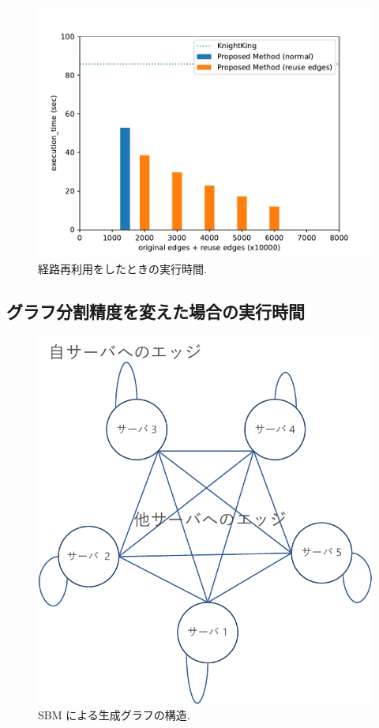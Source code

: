 \begin{figure}[t]
    \centering
    \includegraphics[scale=0.8]{figure/AR_cache.pdf}
    \caption{経路再利用をしたときの実行時間.}
    \label{経路再利用をしたときの実行時間}
\end{figure}

\subsection{グラフ分割精度を変えた場合の実行時間}\label{グラフ分割の汚さを変えた場合の実行時間}

\begin{figure}[t]
    \centering
    \includegraphics[scale=0.7]{figure/sbm.pdf}
    \caption{SBM による生成グラフの構造.}
    \label{SBM による生成グラフの構造}
\end{figure}

